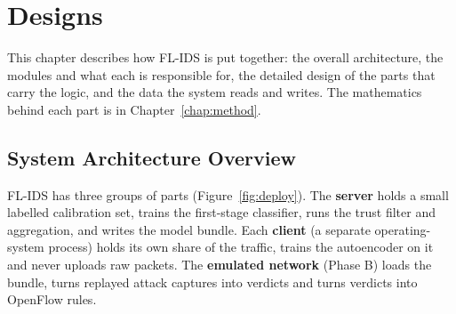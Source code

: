 \chapter{Designs}\label{chap:design}
This chapter describes how FL-IDS is put together: the overall architecture, the modules and what each is responsible for, the detailed design of the parts that carry the logic, and the data the system reads and writes. The mathematics behind each part is in Chapter~\ref{chap:method}.

\section{System Architecture Overview}
FL-IDS has three groups of parts (Figure~\ref{fig:deploy}). The \textbf{server} holds a small labelled calibration set, trains the first-stage classifier, runs the trust filter and aggregation, and writes the model bundle. Each \textbf{client} (a separate operating-system process) holds its own share of the traffic, trains the autoencoder on it and never uploads raw packets. The \textbf{emulated network} (Phase B) loads the bundle, turns replayed attack captures into verdicts and turns verdicts into OpenFlow rules.

